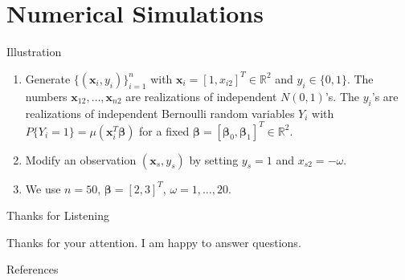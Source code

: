\documentclass{beamer}
\begin{document}
\section{Numerical Simulations}

\begin{frame}
    \tableofcontents[currentsection]
\end{frame}

\begin{frame}{Illustration}

    \begin{enumerate}
        \item Generate $\{(\bm{x}_i, y_i)\}_{i=1}^n$
        with $\bm{x}_i = [1, x_{i2}]^T \in \mathbb{R}^2$ and $y_i \in \{0, 1\}$.
        The numbers $\bm{x}_{12}, \ldots, \bm{x}_{n2}$ are realizations 
        of independent $N(0, 1)$'s.
        The $y_i$'s are realizations of independent Bernoulli random variables $Y_i$
        with $P\{Y_i = 1\} = \mu(\bm{x}_i^T\bm{\beta} )$
        for a fixed $\bm{\beta} = [\bm{\beta}_0, \bm{\beta}_1]^T \in \mathbb{R}^2$.
        \item Modify an observation $(\bm{x}_s, y_s)$
        by setting $y_s = 1$ and $x_{s2} = - \omega$.
        \item We use $n = 50$, $\bm{\beta} = [2, 3]^T$, $\omega = 1, \ldots, 20$.
    \end{enumerate}

\end{frame}

\begin{frame}{Thanks for Listening}

Thanks for your attention.
I am happy to answer questions.

\end{frame}

\begin{frame}[allowframebreaks]{References}


\end{frame}
\end{document}

